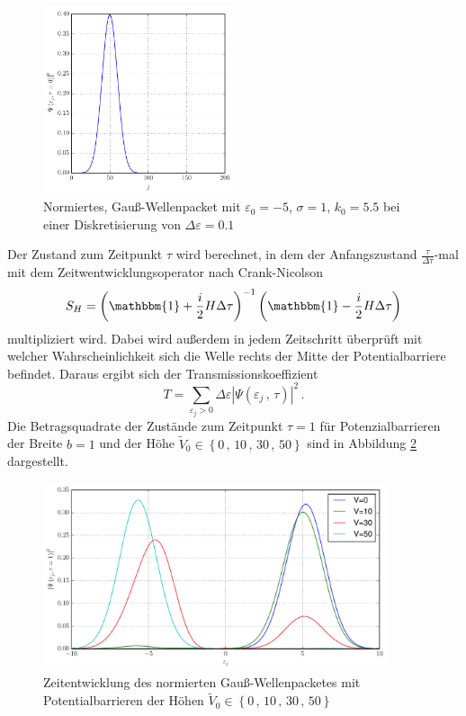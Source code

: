  \begin{figure}[H]
\centering 
\includegraphics[width=0.5\textwidth]{Abbildungen/Anfangszustand.pdf}
\caption{Normiertes, Gauß-Wellenpacket mit $\varepsilon_0=-5$, $\sigma=1$, $k_0=5.5$ bei einer Diskretisierung von $\Delta\varepsilon=0.1$}
\label{Anfangszustand}
\end{figure}\noindent
Der Zustand zum Zeitpunkt $\tau$ wird berechnet, in dem der Anfangszustand $\frac{\tau}{\Delta \tau}$-mal mit dem Zeitwentwicklungsoperator nach Crank-Nicolson
\begin{equation}
S_H=\left(\mathbbm{1}+\frac{i}{2}H\Delta\tau\right)^{-1}
\left(\mathbbm{1}-\frac{i}{2}H\Delta\tau\right)
\end{equation}
multipliziert wird. Dabei wird außerdem in jedem Zeitschritt überprüft mit welcher Wahrscheinlichkeit sich die Welle rechts der Mitte der Potentialbarriere befindet. Daraus ergibt sich der Transmissionskoeffizient 
\begin{equation}
T=\sum_{\varepsilon_j>0} \Delta\varepsilon\left|
\Psi\left(\varepsilon_j\,,\,\tau\right)\right|^2\,.
\end{equation}
Die Betragsquadrate der Zustände zum Zeitpunkt $\tau=1$ für Potenzialbarrieren der Breite $b=1$ und der Höhe $\tilde{V}_0\in\left\lbrace 0\,,\,10\,,\,30\,,\,50\right\rbrace$
sind in Abbildung \ref{Zeitentwicklung} dargestellt.
 \begin{figure}[H]
\centering 
\includegraphics[width=0.9\textwidth]{Abbildungen/Zeitentwicklung.pdf}
\caption{Zeitentwicklung des normierten Gauß-Wellenpacketes mit Potentialbarrieren der Höhen $\tilde{V}_0\in\left\lbrace 0\,,\,10\,,\,30\,,\,50\right\rbrace$}
\label{Zeitentwicklung}
\end{figure}\noindent
